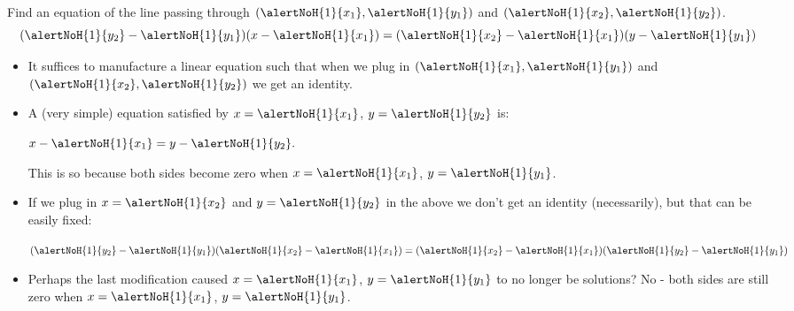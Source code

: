 \begin{frame}
\begin{example}
Find an equation of the line passing through $(\alertNoH{1}{x_1},\alertNoH{1}{y_1})$ and $(\alertNoH{1}{x_2}, \alertNoH{1}{y_2})$.
\[
(\alertNoH{1}{y_2}-\alertNoH{1}{y_1})(x-\alertNoH{1}{x_1})=(\alertNoH{1}{x_2}-\alertNoH{1}{x_1})(y-\alertNoH{1}{y_1})
\]
\begin{itemize}

\item It suffices to manufacture a linear equation such that when we plug in $(\alertNoH{1}{x_1},\alertNoH{1}{y_1})$ and $(\alertNoH{1}{x_2},\alertNoH{1}{y_2})$ we get an identity.
\item A (very simple) equation satisfied by $x=\alertNoH{1}{x_1}$, $ y=\alertNoH{1}{y_2}$ is:

\hfil \hfil$
x-\alertNoH{1}{x_1}=y-\alertNoH{1}{y_2}.
$

This is so because both sides become zero when $x=\alertNoH{1}{x_1}$, $y=\alertNoH{1}{y_1}$.
\item If we plug in $x=\alertNoH{1}{x_2}$ and $y=\alertNoH{1}{y_2}$ in the above we don't get an identity (necessarily), but that can be easily fixed:

\hfil \hfil $
(\alertNoH{1}{y_2}-\alertNoH{1}{y_1}) (\alertNoH{1}{x_2}-\alertNoH{1}{x_1}) =(\alertNoH{1}{x_2}-\alertNoH{1}{x_1})(\alertNoH{1}{y_2}-\alertNoH{1}{y_1}) 
$
\item Perhaps the last modification caused $x=\alertNoH{1}{x_1}$, $y=\alertNoH{1}{y_1}$ to no longer be solutions? No - both sides are still zero when $x=\alertNoH{1}{x_1}$, $y=\alertNoH{1}{y_1}$.
\end{itemize}
\end{example}
\end{frame}